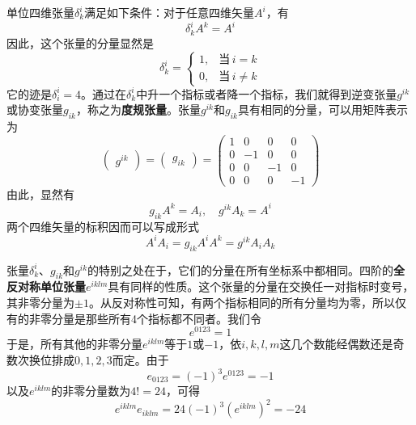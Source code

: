 单位四维张量$\delta^i_k$满足如下条件：对于任意四维矢量$A^i$，有
\begin{equation}
	\delta^i_k A^k = A^i
\end{equation}
因此，这个张量的分量显然是
\begin{equation}
	\delta^i_k = \begin{cases} 1,& \text{当}\,i=k \\ 0, &\text{当}\,i\neq k \end{cases}
\end{equation}
它的迹是$\delta^i_i = 4$。通过在$\delta^i_k$中升一个指标或者降一个指标，我们就得到逆变张量$g^{ik}$或协变张量$g_{ik}$，称之为{\bf 度规张量}。张量$g^{ik}$和$g_{ik}$具有相同的分量，可以用矩阵表示为
\begin{equation}
	\begin{pmatrix} g^{ik} \end{pmatrix} = \begin{pmatrix} g_{ik} \end{pmatrix} = \begin{pmatrix} 1 & 0 & 0 & 0 \\ 0 & -1 & 0 & 0 \\ 0 & 0 & -1 & 0 \\ 0 & 0 & 0 & -1 \end{pmatrix}
\end{equation}
由此，显然有
\begin{equation}
	g_{ik} A^k = A_i,\quad g^{ik} A_k = A^i
\end{equation}
两个四维矢量的标积因而可以写成形式
\begin{equation}
	A^i A_i = g_{ik}A^iA^k = g^{ik}A_iA_k
\end{equation}

张量$\delta^i_k$、$g_{ik}$和$g^{ik}$的特别之处在于，它们的分量在所有坐标系中都相同。四阶的{\bf 全反对称单位张量}$e^{iklm}$具有同样的性质。这个张量的分量在交换任一对指标时变号，其非零分量为$\pm 1$。从反对称性可知，有两个指标相同的所有分量均为零，所以仅有的非零分量是那些所有4个指标都不同者。我们令
\begin{equation}
	e^{0123} = 1
\end{equation}
于是，所有其他的非零分量$e^{iklm}$等于$1$或$-1$，依$i,k,l,m$这几个数能经偶数还是奇数次换位排成$0,1,2,3$而定。由于
\begin{equation*}
	e_{0123} = (-1)^3e^{0123} = -1
\end{equation*}
以及$e^{iklm}$的非零分量数为$4!=24$，可得
\begin{equation}
	e^{iklm}e_{iklm} = 24(-1)^3(e^{iklm})^2 = -24
\end{equation}

